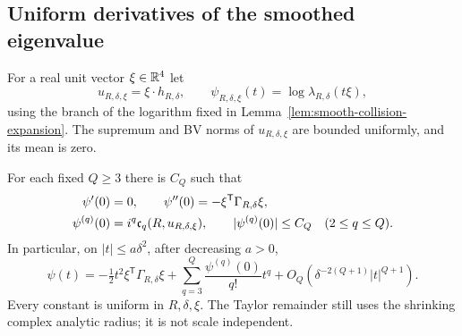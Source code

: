 \subsection{Uniform derivatives of the smoothed eigenvalue}
For a real unit vector $\xi\in\mathbb R^4$ let
\[
 u_{R,\delta,\xi}=\xi\cdot h_{R,\delta},\qquad
 \psi_{R,\delta,\xi}(t)=\log\lambda_{R,\delta}(t\xi),
\]
using the branch of the logarithm fixed in
Lemma~\ref{lem:smooth-collision-expansion}. The supremum and BV norms
of $u_{R,\delta,\xi}$ are bounded uniformly, and its mean is zero.

\begin{theorem}
\label{thm:finite-spectral-jet}
For each fixed $Q\ge3$ there is $C_Q$ such that
\begin{align}
 \psi'(0)&=0,\qquad
 \psi''(0)=-\xi^{\mathsf T}\Gamma_{R,\delta}\xi,\notag\\
 \psi^{(q)}(0)&=i^q\mathfrak c_q(R,u_{R,\delta,\xi}),\qquad
 |\psi^{(q)}(0)|\le C_Q\quad(2\le q\le Q).
 \label{eq:finite-spectral-jet}
\end{align}
In particular, on $|t|\le a\delta^2$, after decreasing $a>0$,
\begin{equation}\label{eq:finite-spectral-Taylor}
 \psi(t)=-\tfrac12t^2\xi^{\mathsf T}\Gamma_{R,\delta}\xi
           +\sum_{q=3}^{Q}\frac{\psi^{(q)}(0)}{q!}t^q
           +O_Q(\delta^{-2(Q+1)}|t|^{Q+1}).
\end{equation}
Every constant is uniform in $R,\delta,\xi$. The Taylor remainder still
uses the shrinking complex analytic radius; it is not scale independent.
\end{theorem}
